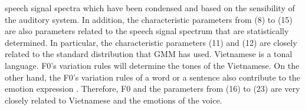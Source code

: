 \documentclass[a4paper,12pt]{article}
\begin{document}
speech signal spectra which have been condensed and based on the sensibility of the auditory
system. In addition, the characteristic parameters from (8) to (15) are also parameters
related to the speech signal spectrum that are statistically determined. In particular, the
characteristic parameters (11) and (12) are closely related to the standard distribution that
GMM has used. Vietnamese is a tonal language. F0’s variation rules will determine the
tones of the Vietnamese. On the other hand, the F0’s variation rules of a word or a sentence
also contribute to the emotion expression \cite{8}. Therefore, F0 and the parameters from (16)
to (23) are very closely related to Vietnamese and the emotions of the voice.

\begin{table}[h]
\caption{ Establishment of characteristic parameter sets used for experiments}
\end{table}
\end{document}
